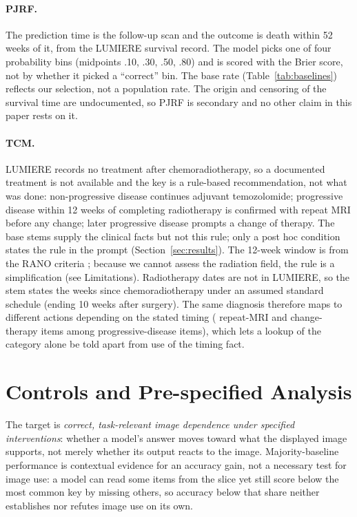 \documentclass[conference]{IEEEtran}
\begin{document}
\paragraph{PJRF.} The prediction time is the follow-up scan and the outcome is death within 52 weeks of it, from the LUMIERE survival record. The model picks one of four probability bins (midpoints .10, .30, .50, .80) and is scored with the Brier score, not by whether it picked a ``correct'' bin. The base rate (Table~\ref{tab:baselines}) reflects our selection, not a population rate. The origin and censoring of the survival time are undocumented, so PJRF is secondary and no other claim in this paper rests on it.

\paragraph{TCM.} LUMIERE records no treatment after chemoradiotherapy, so a documented treatment is not available and the key is a rule-based recommendation, not what was done: non-progressive disease continues adjuvant temozolomide; progressive disease within 12 weeks of completing radiotherapy is confirmed with repeat MRI before any change; later progressive disease prompts a change of therapy. The base stems supply the clinical facts but not this rule; only a post hoc condition states the rule in the prompt (Section~\ref{sec:results}). The 12-week window is from the RANO criteria \citep{wen2010updated}; because we cannot assess the radiation field, the rule is a simplification (see Limitations). Radiotherapy dates are not in LUMIERE, so the stem states the weeks since chemoradiotherapy under an assumed standard schedule (ending 10 weeks after surgery). The same diagnosis therefore maps to different actions depending on the stated timing (\vfourTcmConfirm{} repeat-MRI and \vfourTcmEscalate{} change-therapy items among \vfourTcmPdItems{} progressive-disease items), which lets a lookup of the category alone be told apart from use of the timing fact.




\section{Controls and Pre-specified Analysis}
\label{sec:controls}

The target is \emph{correct, task-relevant image dependence under specified interventions}: whether a model's answer moves toward what the displayed image supports, not merely whether its output reacts to the image. Majority-baseline performance is contextual evidence for an accuracy gain, not a necessary test for image use: a model can read some items from the slice yet still score below the most common key by missing others, so accuracy below that share neither establishes nor refutes image use on its own.
\end{document}

